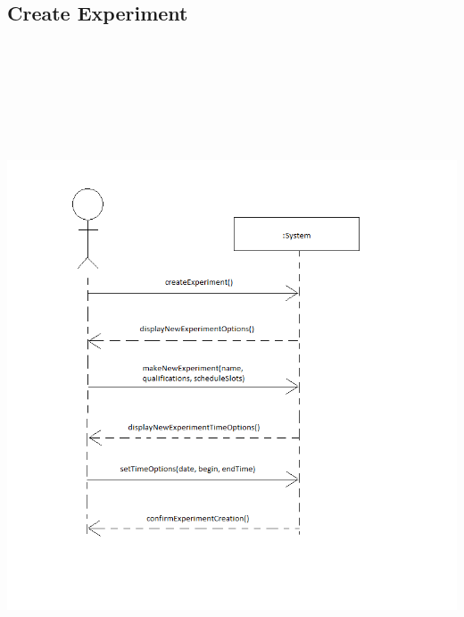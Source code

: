 \subsection{Create Experiment}
\includegraphics[height=8in]{../other/System-Sequence-diagrams/create-experiment.png}
